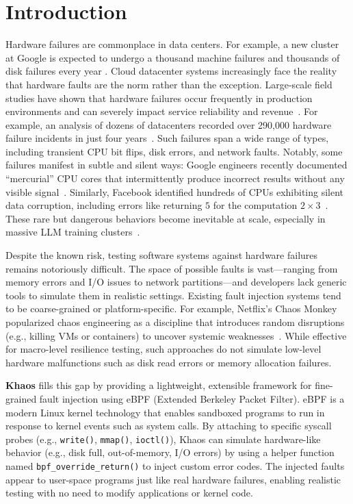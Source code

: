 \section{Introduction}
\label{sec:introduction}

Hardware failures are commonplace in data centers. For example, a new cluster at Google is expected to undergo a thousand machine failures and thousands of disk failures every year \cite{Dean:2009}. Cloud datacenter systems increasingly face the reality that hardware faults are the norm rather than the exception. Large-scale field studies have shown that hardware failures occur frequently in production environments and can severely impact service reliability and revenue~\cite{Wang2017}. For example, an analysis of dozens of datacenters recorded over 290{,}000 hardware failure incidents in just four years~\cite{Wang2017}. Such failures span a wide range of types, including transient CPU bit flips, disk errors, and network faults. Notably, some failures manifest in subtle and silent ways: Google engineers recently documented “mercurial” CPU cores that intermittently produce incorrect results without any visible signal~\cite{Hochschild2021}. Similarly, Facebook identified hundreds of CPUs exhibiting silent data corruption, including errors like returning $5$ for the computation $2 \times 3$~\cite{Dixit2021}. These rare but dangerous behaviors become inevitable at scale, especially in massive LLM training clusters~\cite{Zhang2022opt}.

Despite the known risk, testing software systems against hardware failures remains notoriously difficult. The space of possible faults is vast—ranging from memory errors and I/O issues to network partitions—and developers lack generic tools to simulate them in realistic settings. Existing fault injection systems tend to be coarse-grained or platform-specific. For example, Netflix's Chaos Monkey popularized chaos engineering as a discipline that introduces random disruptions (e.g., killing VMs or containers) to uncover systemic weaknesses~\cite{Basiri2016}. While effective for macro-level resilience testing, such approaches do not simulate low-level hardware malfunctions such as disk read errors or memory allocation failures.

\textbf{Khaos} fills this gap by providing a lightweight, extensible framework for fine-grained fault injection using eBPF (Extended Berkeley Packet Filter). eBPF is a modern Linux kernel technology that enables sandboxed programs to run in response to kernel events such as system calls. By attaching to specific syscall probes (e.g., \texttt{write()}, \texttt{mmap()}, \texttt{ioctl()}), Khaos can simulate hardware-like behavior (e.g., disk full, out-of-memory, I/O errors) by using a helper function named \texttt{bpf\_override\_return()} to inject custom error codes. The injected faults appear to user-space programs just like real hardware failures, enabling realistic testing with no need to modify applications or kernel code.

